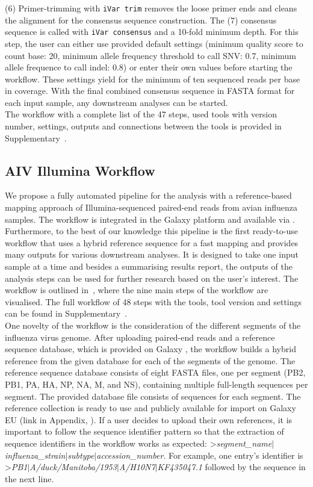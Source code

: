 (6) Primer-trimming with \texttt{iVar trim} removes the loose primer ends and cleans the alignment for the consensus sequence construction. The (7) consensus sequence is called with \texttt{iVar consensus} and a 10-fold minimum depth. For this step, the user can either use provided default settings (minimum quality score to count base: 20, minimum allele frequency threshold to call SNV: 0.7, minimum allele frequence to call indel: 0.8) or enter their own values before starting the workflow. These settings yield for the minimum of ten sequenced reads per base in coverage. With the final combined consensus sequence in FASTA format for each input sample, any downstream analyses can be started. \\
The workflow with a complete list of the 47 steps, used tools with version number, settings, outputs and connections between the tools is provided in Supplementary~. 

\subsection{AIV Illumina Workflow}\label{sec:aiv-wf}
We propose a fully automated pipeline for the analysis with a reference-based mapping approach of Illumina-sequenced paired-end reads from avian influenza samples. The workflow is integrated in the Galaxy platform and available via . Furthermore, to the best of our knowledge this pipeline is the first ready-to-use workflow that uses a hybrid reference sequence for a fast mapping and provides many outputs for various downstream analyses. It is designed to take one input sample at a time and besides a summarising results report, the outputs of the analysis steps can be used for further research based on the user's interest. The workflow is outlined in~, where the nine main steps of the workflow are visualised. The full workflow of 48 steps with the tools, tool version and settings can be found in Supplementary~. \\
One novelty of the workflow is the consideration of the different segments of the influenza virus genome. After uploading paired-end reads and a reference sequence database, which is provided on Galaxy , the workflow builds a hybrid reference from the given database for each of the segments of the genome. The reference sequence database consists of eight FASTA files, one per segment (PB2, PB1, PA, HA, NP, NA, M, and NS), containing multiple full-length sequences per segment. The provided database file consists of  sequences for each segment. The reference collection is ready to use and publicly available for import on Galaxy EU (link in Appendix, ). If a user decides to upload their own references, it is important to follow the sequence identifier pattern so that the extraction of sequence identifiers in the workflow works as expected: >\textit{segment\_name$\mid$influenza\_strain$\mid$subtype$\mid$accession\_number}. For example, one entry's identifier is >\textit{PB1$\mid$A/duck/Manitoba/1953$\mid$A/H10N7$\mid$KF435047.1} followed by the sequence in the next line. 

